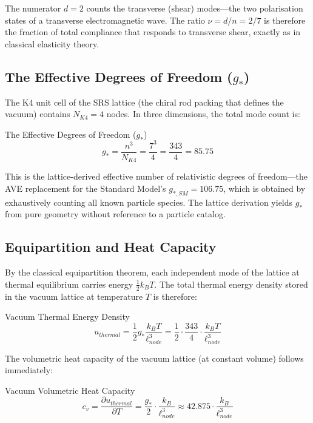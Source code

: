 The numerator $d = 2$ counts the transverse (shear) modes---the two polarisation states of a transverse electromagnetic wave. The ratio $\nu = d/n = 2/7$ is therefore the fraction of total compliance that responds to transverse shear, exactly as in classical elasticity theory.

\subsection{The Effective Degrees of Freedom ($g_*$)}

The K4 unit cell of the SRS lattice (the chiral rod packing that defines the vacuum) contains $N_{K4} = 4$ nodes. In three dimensions, the total mode count is:
\begin{resultbox}{The Effective Degrees of Freedom ($g_*$)}
\begin{equation}
    g_* = \frac{n^3}{N_{K4}} = \frac{7^3}{4} = \frac{343}{4} = 85.75
    \label{eq:g_star}
\end{equation}
\end{resultbox}

This is the lattice-derived effective number of relativistic degrees of freedom---the AVE replacement for the Standard Model's $g_{*,SM} = 106.75$, which is obtained by exhaustively counting all known particle species. The lattice derivation yields $g_*$ from pure geometry without reference to a particle catalog.

\subsection{Equipartition and Heat Capacity}

By the classical equipartition theorem, each independent mode of the lattice at thermal equilibrium carries energy $\frac{1}{2} k_B T$. The total thermal energy density stored in the vacuum lattice at temperature $T$ is therefore:
\begin{resultbox}{Vacuum Thermal Energy Density}
\begin{equation}
    u_{thermal} = \frac{1}{2} g_* \frac{k_B T}{\ell_{node}^3} = \frac{1}{2} \cdot \frac{343}{4} \cdot \frac{k_B T}{\ell_{node}^3}
    \label{eq:thermal_energy_density}
\end{equation}
\end{resultbox}

The volumetric heat capacity of the vacuum lattice (at constant volume) follows immediately:
\begin{resultbox}{Vacuum Volumetric Heat Capacity}
\begin{equation}
    c_v = \frac{\partial u_{thermal}}{\partial T} = \frac{g_*}{2} \cdot \frac{k_B}{\ell_{node}^3} \approx 42.875 \cdot \frac{k_B}{\ell_{node}^3}
    \label{eq:heat_capacity}
\end{equation}
\end{resultbox}

